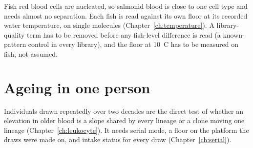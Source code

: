Fish red blood cells are nucleated, so salmonid blood is close to one cell type and needs almost no separation. Each fish is read against its own floor at its recorded water temperature, on single molecules (Chapter~\ref{ch:temperature}). A
library-quality term has to be removed before any fish-level difference is read (a known-pattern control in every library), and the floor at 10~\textdegree C has to be measured on fish, not assumed. \openprob

\section{Ageing in one person}

Individuals drawn repeatedly over two decades are the direct test of whether an elevation in older blood is a slope shared by every lineage or a clone moving one lineage
(Chapter~\ref{ch:leukocyte}). It needs serial mode, a floor on the platform the draws were made on, and intake status for every draw (Chapter~\ref{ch:serial}). \openprob
